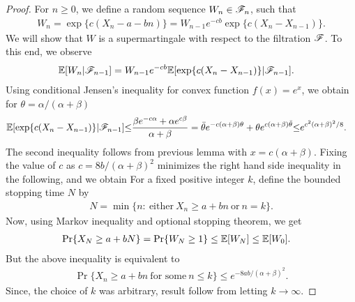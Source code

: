 \documentclass[a4paper,10pt,english]{article}
\begin{document}
\begin{proof}
For $n \geq 0$, we define a random sequence $W_n \in \mathscr{F}_n$, such that
\begin{align*}
W_n = \exp\{c(X_n-a-bn)\} = W_{n-1}e^{-cb}\exp\{c(X_n-X_{n-1})\}.
\end{align*}
We will show that $W$ is a supermartingale with respect to the filtration $\mathscr{F}$. %
To this end, we observe 
\begin{align*}
\mathbb{E}[W_n|\mathscr{F}_{n-1}]&=W_{n-1}e^{-cb}\mathbb{E}[\exp\{c(X_n-X_{n-1})\}|\mathscr{F}_{n-1}].
\end{align*}
Using conditional Jensen's inequality for convex function $f(x) = e^x$, we obtain for $\theta = \alpha/(\alpha + \beta)$
\begin{align*}
\mathbb{E}[\exp\{c(X_n-X_{n-1})\}|\mathscr{F}_{n-1}]
&{\leq} \frac{\beta e^{-c\alpha} + \alpha e^{c\beta}}{\alpha+\beta} = \bar{\theta}e^{-c(\alpha+\beta)\theta} + \theta e^{c(\alpha+\beta)\bar{\theta}} {\leq} e^{c^2{(\alpha+\beta)}^2/8}.
\end{align*}
The second inequality follows from previous lemma with %
$x=c(\alpha+\beta)$. 
Fixing the value of $c$ as $c=8b/{(\alpha+\beta)}^2$ minimizes the right hand side inequality in the following, 
and we obtain 
For a fixed positive integer $k$, define the bounded stopping time $N$ by 
\begin{align*}
N= \min\{n: ~\text{either}~ X_n \geq a+bn ~ \text{or}~ n=k \}.
\end{align*} 
Now, using Markov inequality and optional stopping theorem, we get
\begin{align*}
\Pr\{X_N \geq a+bN\}&= \Pr\{W_N \geq 1\} \leq \mathbb{E}[W_N] \leq \mathbb{E}[W_0].
\end{align*}
But the above inequality is equivalent to
\begin{align*}
\Pr\{X_n \geq a+bn ~ \text{for some}~ n \leq k\} \leq e^{-8ab/{(\alpha+\beta)}^2}.
\end{align*}
Since, the choice of $k$ was arbitrary, result follow from letting $k \to \infty$. 
\end{proof}
\end{document}
